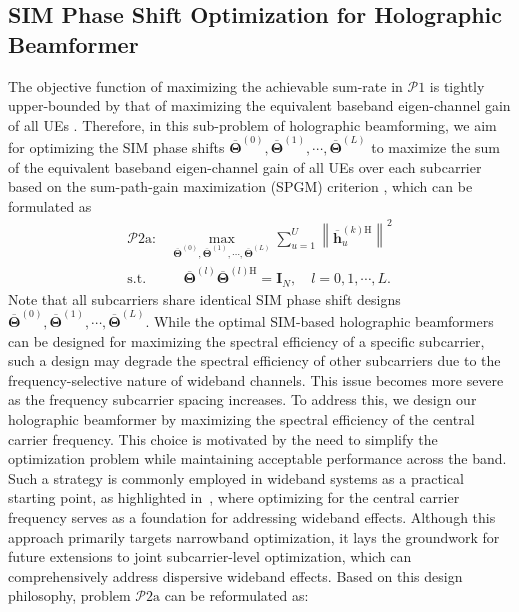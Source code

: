 \documentclass[lettersize,journal]{IEEEtran}
\theoremstyle{remark}
\begin{document}
\subsection{SIM Phase Shift Optimization for Holographic Beamformer}
The objective function of maximizing the achievable sum-rate in $\mathcal{P}\mathrm{1}$ is tightly upper-bounded by that of maximizing the equivalent baseband eigen-channel gain of all UEs \cite{an2024adjustable}. Therefore, in this sub-problem of holographic beamforming, we aim for optimizing the SIM phase shifts $\overline{\mathbf{\Theta}}^{(0)},\overline{\mathbf{\Theta}}^{(1)},\cdots,
\overline{\mathbf{\Theta}}^{(L)}$ to maximize the sum of the equivalent baseband eigen-channel gain of all UEs over each subcarrier based on the sum-path-gain maximization (SPGM) criterion \cite{ning2020beamforming}, which can be formulated as
\begin{align}\label{Beamforming_Design_9}
    \mathcal{P}\mathrm{2a}:&\max_{\overline{\mathbf{\Theta}}^{(0)},\overline{\mathbf{\Theta}}^{(1)},
    \cdots,\overline{\mathbf{\Theta}}^{(L)}}
    \sum_{u=1}^{U}\left\|\overline{\mathbf{h}}_u^{(k)\mathrm{H}}\right\|^2\\
    \text{s.t.}&\quad \overline{\mathbf{\Theta}}^{(l)}
    \overline{\mathbf{\Theta}}^{(l)\mathrm{H}}=\mathbf{I}_N,
    \quad l=0,1,\cdots,L.
\end{align}
Note that all subcarriers share identical SIM phase shift designs $\overline{\mathbf{\Theta}}^{(0)},\overline{\mathbf{\Theta}}^{(1)},\cdots,
\overline{\mathbf{\Theta}}^{(L)}$. While the optimal SIM-based holographic beamformers can be designed for maximizing the spectral efficiency of a specific subcarrier, such a design may degrade the spectral efficiency of other subcarriers due to the frequency-selective nature of wideband channels. This issue becomes more severe as the frequency subcarrier spacing increases. To address this, we design our holographic beamformer by maximizing the spectral efficiency of the central carrier frequency. This choice is motivated by the need to simplify the optimization problem while maintaining acceptable performance across the band. Such a strategy is commonly employed in wideband systems as a practical starting point, as highlighted in~\cite{xu2024near}, where optimizing for the central carrier frequency serves as a foundation for addressing wideband effects. Although this approach primarily targets narrowband optimization, it lays the groundwork for future extensions to joint subcarrier-level optimization, which can comprehensively address dispersive wideband effects. Based on this design philosophy, problem $\mathcal{P}\mathrm{2a}$ can be reformulated as:
\end{document}
